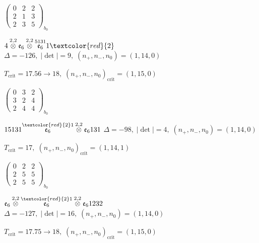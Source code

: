 \documentclass[10pt]{article}
\begin{document}
\hspace{2em}$\left(\begin{smallmatrix}0 & 2 & 2 \\ 2 & 1 & 3 \\ 2 & 3 & 5\end{smallmatrix}\right)_{\!b_0}$

\smallskip

$4\overset{2,2}{\otimes}\mathfrak{e}_6\overset{2,2}{\otimes}\overset{5131}{\mathfrak{e}_6}1\textcolor{red}{2}$ \quad $\Delta=-126,\; |\det|=9,\; (n_+,n_-,n_0)=(1,14,0)$

\hspace{1em}$T_{\text{crit}}=17.56 \to 18,\; (n_+,n_-,n_0)_{\text{crit}}=(1,15,0)$

\hspace{2em}$\left(\begin{smallmatrix}0 & 3 & 2 \\ 3 & 2 & 4 \\ 2 & 4 & 4\end{smallmatrix}\right)_{\!b_0}$

\smallskip

$15131\overset{\textcolor{red}{2}1}{\mathfrak{e}_6}\overset{2,2}{\otimes}\mathfrak{e}_6131$ \quad $\Delta=-98,\; |\det|=4,\; (n_+,n_-,n_0)=(1,14,0)$

\hspace{1em}$T_{\text{crit}}=17,\; (n_+,n_-,n_0)_{\text{crit}}=(1,14,1)$

\hspace{2em}$\left(\begin{smallmatrix}0 & 2 & 2 \\ 2 & 5 & 5 \\ 2 & 5 & 5\end{smallmatrix}\right)_{\!b_0}$

\smallskip

$\mathfrak{e}_6\overset{2,2}{\otimes}\overset{\textcolor{red}{2}1}{\mathfrak{e}_6}\overset{2,2}{\otimes}\mathfrak{e}_61232$ \quad $\Delta=-127,\; |\det|=16,\; (n_+,n_-,n_0)=(1,14,0)$

\hspace{1em}$T_{\text{crit}}=17.75 \to 18,\; (n_+,n_-,n_0)_{\text{crit}}=(1,15,0)$
\end{document}
